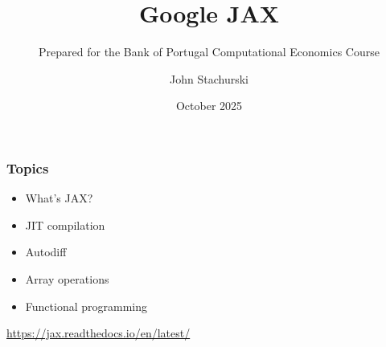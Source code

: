 

\title{Google JAX}
\subtitle{Prepared for the Bank of Portugal Computational Economics Course}

\author{John Stachurski}


\date{October 2025}




\begin{frame}
  \titlepage
\end{frame}



\begin{frame}
    \frametitle{Topics}

    \begin{itemize}
        \item What's JAX?
        \vspace{0.5em}
        \item JIT compilation
        \vspace{0.5em}
        \item Autodiff
        \vspace{0.5em}
        \item Array operations
        \vspace{0.5em}
        \item Functional programming
    \end{itemize}

\end{frame}


\begin{frame}

    \begin{figure}
       \centering
    \end{figure}
    
            \vspace{0.5em}

    \begin{center}
        \url{https://jax.readthedocs.io/en/latest/}
    \end{center}

\end{frame}

